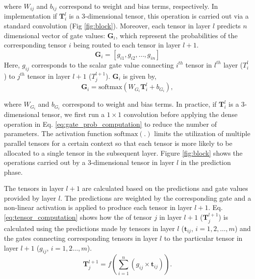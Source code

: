 \documentclass[10pt,twocolumn,letterpaper]{article}
\begin{document}
where $ W_{ij}$ and $b_{ij}$ correspond to weight and bias terms, respectively. In implementation if $\boldsymbol{T}^l_i$ is a 3-dimensional tensor, this operation is carried out via a standard convolution (Fig \ref{fig:block}). Moreover, each tensor in layer $l$  predicts $n$ dimensional vector of gate values: $\boldsymbol{G}_i$, which represent the probabilities of the corresponding tensor $i$ being routed to each tensor in layer $l+1$. \vspace{-0.1in}
\[\boldsymbol{G}_i = [g_{i1}, g_{i2}, \dots, g_{in}]  \] 
Here, $g_{ij}$ corresponds to the scalar gate value connecting $i^{th}$ tensor in $l^{th}$ layer ($T^l_i$) to  $j^{th}$ tensor in layer $l+1$ ($T^{l+1}_j$). $\boldsymbol{G}_i$ is given by,
\vspace{-0.1in}
\begin{equation}
\boldsymbol{G}_i = \mathrm{softmax}(W_{G_{i}}\boldsymbol{T}^{l}_{i} + b_{G_{i}}),
\label{eq:gate_prob_computation}
\end{equation}

where $ W_{G_{i}}$ and $b_{G_{i}}$ correspond to weight and bias terms.
In practice, if $\boldsymbol{T}^l_i$ is a 3-dimensional tensor, we first run a $1\times1$ convolution before applying the dense operation in Eq. \ref{eq:gate_prob_computation} to reduce the number of parameters. The activation function $\mathrm{softmax}(.)$ limits the utilization of multiple parallel tensors for a certain context so that each tensor is more likely to be allocated to a single tensor in the subsequent layer. Figure \ref{fig:block} shows the operations carried out by a 3-dimensional tensor in layer $l$ in the prediction phase.




The tensors in layer $l+1$ are calculated based on the predictions and gate values provided by layer $l$. The predictions are weighted by the corresponding gate and a non-linear activation is applied to produce each tensor in layer $l+1$.
Eq. \ref{eq:tensor_computation} shows how the of tensor $j$ in layer $l+1$ ($\boldsymbol{T}^{l+1}_{j}$) is calculated using the predictions made by tensors in layer $l$ ($\boldsymbol{t}_{ij}$, $i=1, 2, \dots,  m$) and the gates connecting corresponding tensors in layer $l$ to the particular tensor in layer $l+1$ ($g_{ij}$, $i=1, 2 \dots, m$).
\vspace{-0.1in}
\begin{equation}
\boldsymbol{T}^{l+1}_{j} = f\left(\sum_{i=1}^{n} (g_{ij}\times \boldsymbol{t}_{ij})\right).
\label{eq:tensor_computation}
\end{equation}
\end{document}
